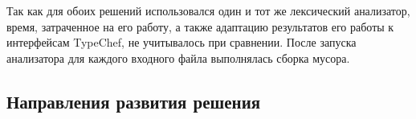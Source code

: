 Так как для обоих решений использовался один и тот же лексический анализатор, время, затраченное на его работу, а также адаптацию результатов его работы к интерфейсам TypeChef, не учитывалось при сравнении. После запуска анализатора для каждого входного файла выполнялась сборка мусора.





\subsection{Направления развития решения}



